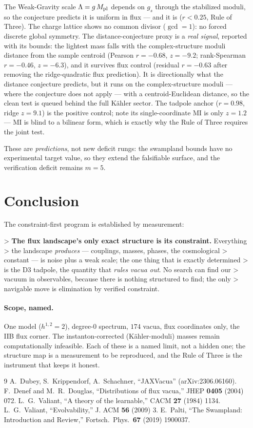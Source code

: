 \documentclass[11pt]{article}
\begin{document}
The Weak-Gravity scale $\Lambda=g\,M_{\rm pl}$ depends on $g_s$ through the
stabilized moduli, so the conjecture predicts it is uniform in flux --- and it is
($r<0.25$, Rule of Three). The charge lattice shows no common divisor ($\gcd=1$): no
forced discrete global symmetry. The distance-conjecture proxy is a \emph{real
signal}, reported with its bounds: the lightest mass falls with the complex-structure
moduli distance from the sample centroid (Pearson $r=-0.68$, $z=-9.2$; rank-Spearman
$r=-0.46$, $z=-6.3$), and it survives flux control (residual $r=-0.63$ after removing
the ridge-quadratic flux prediction). It is directionally what the distance conjecture
predicts, but it runs on the complex-structure moduli --- where the conjecture does
not apply --- with a centroid-Euclidean distance, so the clean test is queued behind
the full K\"ahler sector. The tadpole anchor ($r=0.98$, ridge $z=9.1$) is the positive
control; note its single-coordinate MI is only $z=1.2$ --- MI is blind to a bilinear
form, which is exactly why the Rule of Three requires the joint test.

These are \emph{predictions}, not new deficit rungs: the swampland bounds have no
experimental target value, so they extend the falsifiable surface, and the
verification deficit remains $m=5$.

\section{Conclusion}

The constraint-first program is established by measurement:

> \textbf{The flux landscape's only exact structure is its constraint.} Everything
> the landscape \emph{produces} --- couplings, masses, phases, the cosmological
> constant --- is noise plus a weak scale; the one thing that is exactly determined
> is the D3 tadpole, the quantity that \emph{rules vacua out}. No search can find our
> vacuum in observables, because there is nothing structured to find; the only
> navigable move is elimination by verified constraint.

\paragraph{Scope, named.} One model ($h^{1,2}=2$), degree-$0$ spectrum, $174$ vacua,
flux coordinates only, the IIB flux corner. The instanton-corrected (K\"ahler-moduli)
masses remain computationally infeasible. Each of these is a named limit, not a
hidden one; the structure map is a measurement to be reproduced, and the Rule of
Three is the instrument that keeps it honest.

\begin{thebibliography}{9}
 A.~Dubey, S.~Krippendorf, A.~Schachner, ``JAXVacua'' (arXiv:2306.06160).
 F.~Denef and M.~R.~Douglas, ``Distributions of flux vacua,'' JHEP \textbf{0405} (2004) 072.
 L.~G.~Valiant, ``A theory of the learnable,'' CACM \textbf{27} (1984) 1134.
 L.~G.~Valiant, ``Evolvability,'' J. ACM \textbf{56} (2009) 3.
 E.~Palti, ``The Swampland: Introduction and Review,'' Fortsch.\ Phys.\ \textbf{67} (2019) 1900037.
\end{thebibliography}
\end{document}
